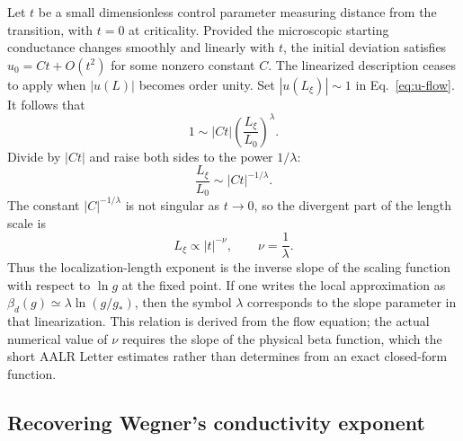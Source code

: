 \documentclass[11pt,a4paper]{article}
\numberwithin{equation}{section}
\begin{document}
Let $t$ be a small dimensionless control parameter measuring distance from the transition, with $t=0$ at criticality. Provided the microscopic starting conductance changes smoothly and linearly with $t$, the initial deviation satisfies $u_0=Ct+O(t^2)$ for some nonzero constant $C$. The linearized description ceases to apply when $|u(L)|$ becomes order unity. Set $|u(L_\xi)|\sim1$ in Eq.~\eqref{eq:u-flow}. It follows that
\begin{equation}
    1\sim |C t|\left(\frac{L_\xi}{L_0}\right)^\lambda.
\end{equation}
Divide by $|Ct|$ and raise both sides to the power $1/\lambda$:
\begin{equation}
    \frac{L_\xi}{L_0}\sim |Ct|^{-1/\lambda}.
\end{equation}
The constant $|C|^{-1/\lambda}$ is not singular as $t\to0$, so the divergent part of the length scale is
\begin{equation}
    L_\xi\propto |t|^{-\nu},
    \qquad \boxed{\nu=\frac{1}{\lambda}}.
    \label{eq:nu-slope}
\end{equation}
Thus the localization-length exponent is the inverse slope of the scaling function with respect to $\ln g$ at the fixed point. If one writes the local approximation as $\beta_d(g)\simeq\lambda\ln(g/g_*)$, then the symbol $\lambda$ corresponds to the slope parameter in that linearization. This relation is derived from the flow equation; the actual numerical value of $\nu$ requires the slope of the physical beta function, which the short AALR Letter estimates rather than determines from an exact closed-form function.

\subsection{Recovering Wegner's conductivity exponent}
\end{document}
